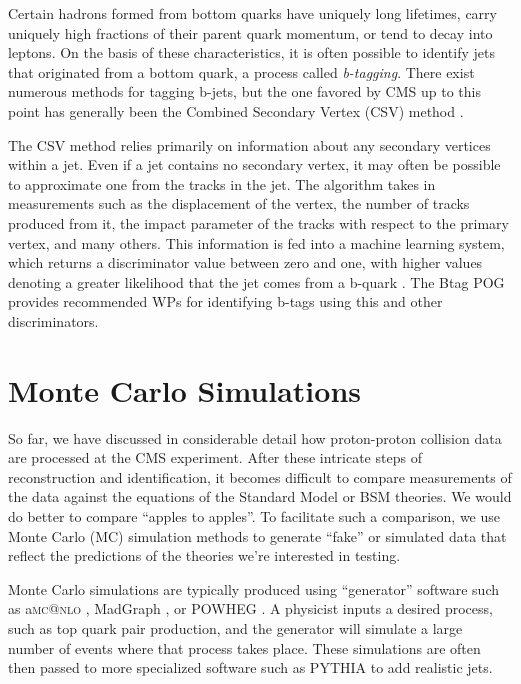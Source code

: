 Certain hadrons formed
from bottom quarks have uniquely long lifetimes, carry uniquely high
fractions of their parent quark momentum, or tend to decay into leptons. On
the basis of these characteristics, it is often possible to identify
jets that originated from a bottom quark, a process called
\emph{b-tagging}. There exist numerous methods for tagging b-jets, but
the one favored by CMS up to this point has generally been the
Combined Secondary Vertex (CSV) method \cite{btag1,btag2}.

The CSV method relies primarily on information about any secondary vertices
within a jet. Even if a jet contains no secondary vertex, it may often
be possible to approximate one from the tracks in the jet. The
algorithm takes in measurements such as the displacement of the
vertex, the number of tracks produced from it, the impact parameter of
the tracks with respect to the primary vertex, and many others. This
information is fed into a machine learning system, which returns a
discriminator value between zero and one, with higher values denoting
a greater likelihood that the jet comes from a b-quark
\cite{btag1,btag2}. The Btag POG provides recommended WPs for
identifying b-tags using this and other discriminators.

\section{Monte Carlo Simulations}
\label{sec:cms:montecarlo}

So far, we have discussed in considerable detail how
proton-proton collision data are processed at the CMS
experiment. After these intricate steps of reconstruction and identification,
it becomes difficult to compare measurements of the
data against the equations of the Standard
Model or BSM theories. We would do better to compare
``apples to apples''. To facilitate such a comparison, we use Monte
Carlo (MC) simulation methods to generate ``fake'' or simulated data
that reflect the predictions of the theories we're interested in
testing.

Monte Carlo simulations are typically produced using ``generator''
software such as a\textsc{mc@nlo} \cite{madgraph},
MadGraph \cite{madgraph}, or POWHEG \cite{powheg}. A physicist
inputs a desired process, such as top quark pair production, and the
generator will simulate a large number of events where that process
takes place. These simulations are often then passed
to more specialized software such as PYTHIA \cite{pythia} to add realistic jets.

